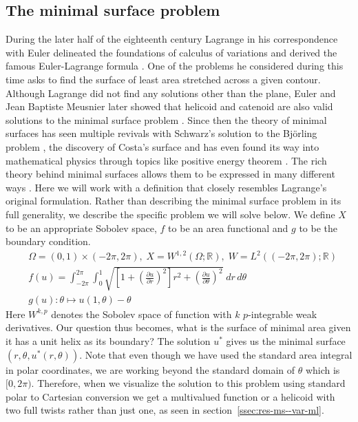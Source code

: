 \subsection{The minimal surface problem} During the later half of the eighteenth century Lagrange in his correspondence with Euler delineated the foundations of calculus of variations and derived the famous Euler-Lagrange formula \cite{goldstine2012history}. One of the problems he considered during this time asks to find the surface of least area stretched across a given contour. Although Lagrange did not find any solutions other than the plane, Euler and Jean Baptiste Meusnier later showed that helicoid and catenoid are also valid solutions to the minimal surface problem \cite{meusnier1785memoire}. Since then the theory of minimal surfaces has seen multiple revivals with Schwarz's solution to the Björling problem \cite{darboux1896leccons}, the discovery of Costa's surface \cite{costa1984example} and has even found its way into mathematical physics through topics like positive energy theorem \cite{schoen1979proof}. The rich theory behind minimal surfaces allows them to be expressed in many different ways \cite{colding2011course}. Here we will work with a definition that closely resembles Lagrange's original formulation. Rather than describing the minimal surface problem in its full generality, we describe the specific problem we will solve below. We define $X$ to be an appropriate Sobolev space, $f$ to be an area functional and $g$ to be the boundary condition.
\begin{equation}
\begin{aligned}
    &\Omega=(0,1 )\times(-2\pi, 2\pi),\;X=W^{1, 2}(\Omega;\mathbb R),\; W=L^{2}((-2\pi,2\pi);\mathbb R)\\
    &f(u)=\int_{-2\pi}^{2\pi}\int_0^1\sqrt{\left[1+\left(\frac{\partial u}{\partial r}\right)^2\right]r^2+\left(\frac{\partial u}{\partial\theta}\right)^2}\;dr\,d\theta\\
&g(u): \theta \mapsto u(1, \theta) - \theta\label{eq:ms--var-ml}
\end{aligned}    
\end{equation}
Here $W^{k, p}$ denotes the Sobolev space of function with $k$ $p$-integrable weak derivatives. Our question thus becomes, what is the surface of minimal area given it has a unit helix as its boundary? The solution $u^*$ gives us the minimal surface $(r, \theta, u^*(r,\theta))$. Note that even though we have used the standard area integral in polar coordinates, we are working beyond the standard domain of $\theta$ which is $[0, 2\pi)$. Therefore, when we visualize the solution to this problem using standard polar to Cartesian conversion we get a multivalued function or a helicoid with two full twists rather than just one, as seen in section~\ref{ssec:res-ms--var-ml}.

